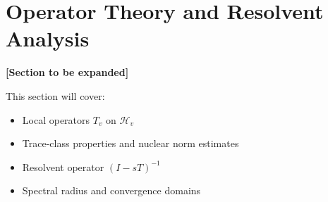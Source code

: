 \section{Operator Theory and Resolvent Analysis}
\label{sec:operator_resolvent}

\textbf{[Section to be expanded]}

This section will cover:
\begin{itemize}
\item Local operators $T_v$ on $\mathcal{H}_v$
\item Trace-class properties and nuclear norm estimates
\item Resolvent operator $(I - sT)^{-1}$
\item Spectral radius and convergence domains
\end{itemize}
